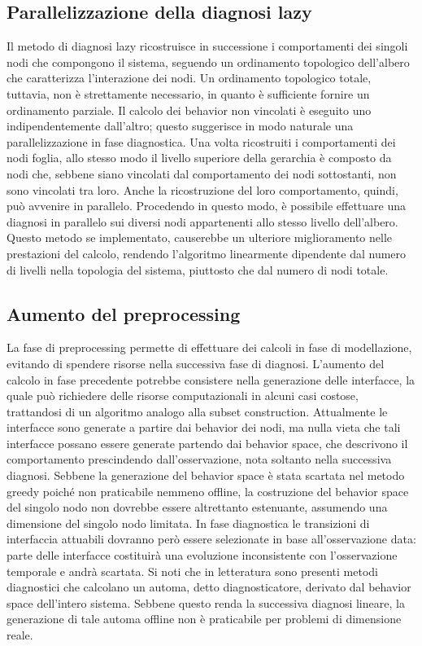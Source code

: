 \subsection{Parallelizzazione della diagnosi lazy}
Il metodo di diagnosi lazy ricostruisce in successione i comportamenti dei singoli nodi che compongono il sistema, seguendo un ordinamento topologico dell'albero che caratterizza l'interazione dei nodi. Un ordinamento topologico totale, tuttavia, non è strettamente necessario, in quanto è sufficiente fornire un ordinamento parziale. Il calcolo dei behavior non vincolati è eseguito uno indipendentemente dall'altro; questo suggerisce in modo naturale una parallelizzazione in fase diagnostica. Una volta ricostruiti i comportamenti dei nodi foglia, allo stesso modo il livello superiore della gerarchia è composto da nodi che, sebbene siano vincolati dal comportamento dei nodi sottostanti, non sono vincolati tra loro. Anche la ricostruzione del loro comportamento, quindi, può avvenire in parallelo. Procedendo in questo modo, è possibile effettuare una diagnosi in parallelo sui diversi nodi appartenenti allo stesso livello dell'albero. Questo metodo se implementato, causerebbe un ulteriore miglioramento nelle prestazioni del calcolo, rendendo l'algoritmo linearmente dipendente dal numero di livelli nella topologia del sistema, piuttosto che dal numero di nodi totale. 

\subsection{Aumento del preprocessing}
La fase di preprocessing permette di effettuare dei calcoli in fase di modellazione, evitando di spendere risorse nella successiva fase di diagnosi. L'aumento del calcolo in fase precedente potrebbe consistere nella generazione delle interfacce, la quale può richiedere delle risorse computazionali in alcuni casi costose, trattandosi di un algoritmo analogo alla subset construction. Attualmente le interfacce sono generate a partire dai behavior dei nodi, ma nulla vieta che tali interfacce possano essere generate partendo dai behavior space, che descrivono il comportamento prescindendo dall'osservazione, nota soltanto nella successiva diagnosi. Sebbene la generazione del behavior space è stata scartata nel metodo greedy poiché non praticabile nemmeno offline, la costruzione del behavior space del singolo nodo non dovrebbe essere altrettanto estenuante, assumendo una dimensione del singolo nodo limitata. In fase diagnostica le transizioni di interfaccia attuabili dovranno però essere selezionate in base all'osservazione data: parte delle interfacce costituirà una evoluzione inconsistente con l'osservazione temporale e andrà scartata. Si noti che in letteratura sono presenti metodi diagnostici che calcolano un automa, detto diagnosticatore, derivato dal behavior space dell'intero sistema. Sebbene questo renda la successiva diagnosi lineare, la generazione di tale automa offline non è praticabile per problemi di dimensione reale.


